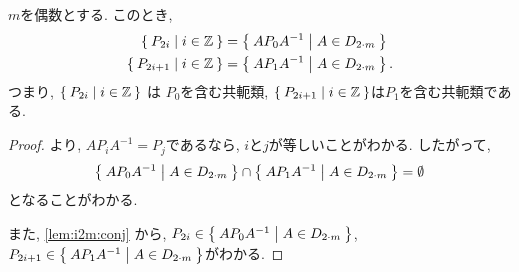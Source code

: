 \begin{prop}
  $m$を偶数とする.
  このとき,
  \begin{align*}
    \Set{P_{2i}|i\in\mathbb{Z}}&=\Set{AP_0A^{-1} | A \in D_{2\cdot m}}\\
    \Set{P_{2i+1}|i\in\mathbb{Z}}&=\Set{AP_1A^{-1} | A \in D_{2\cdot m}}.
  \end{align*}
つまり, 
$\Set{P_{2i}|i\in\mathbb{Z}}$ は $P_0$を含む共軛類,
$\Set{P_{2i+1}|i\in\mathbb{Z}}$は$P_1$を含む共軛類である.
\end{prop}
\begin{proof}
  より, $AP_iA^{-1}=P_j$であるなら, $i$と$j$が等しいことがわかる.
  したがって,
  \begin{align*}
    \Set{AP_0A^{-1} | A \in D_{2\cdot m}} \cap
    \Set{AP_1A^{-1} | A \in D_{2\cdot m}} = \emptyset
  \end{align*}
  となることがわかる.

  また,
  \cref{lem:i2m:conj}  
  から,
  $P_{2i}\in \Set{AP_0A^{-1} | A \in D_{2\cdot m}}$,
  $P_{2i+1}\in \Set{AP_1A^{-1} | A \in D_{2\cdot m}}$がわかる.
\end{proof}

